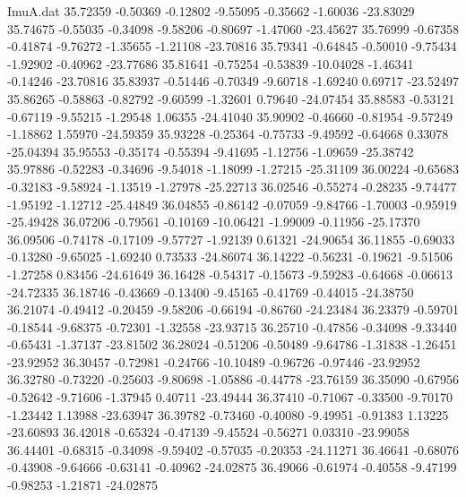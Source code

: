 \begin{filecontents}{ImuA.dat}
  35.72359   -0.50369   -0.12802   -9.55095   -0.35662   -1.60036  -23.83029
  35.74675   -0.55035   -0.34098   -9.58206   -0.80697   -1.47060  -23.45627
  35.76999   -0.67358   -0.41874   -9.76272   -1.35655   -1.21108  -23.70816
  35.79341   -0.64845   -0.50010   -9.75434   -1.92902   -0.40962  -23.77686
  35.81641   -0.75254   -0.53839  -10.04028   -1.46341   -0.14246  -23.70816
  35.83937   -0.51446   -0.70349   -9.60718   -1.69240    0.69717  -23.52497
  35.86265   -0.58863   -0.82792   -9.60599   -1.32601    0.79640  -24.07454
  35.88583   -0.53121   -0.67119   -9.55215   -1.29548    1.06355  -24.41040
  35.90902   -0.46660   -0.81954   -9.57249   -1.18862    1.55970  -24.59359
  35.93228   -0.25364   -0.75733   -9.49592   -0.64668    0.33078  -25.04394
  35.95553   -0.35174   -0.55394   -9.41695   -1.12756   -1.09659  -25.38742
  35.97886   -0.52283   -0.34696   -9.54018   -1.18099   -1.27215  -25.31109
  36.00224   -0.65683   -0.32183   -9.58924   -1.13519   -1.27978  -25.22713
  36.02546   -0.55274   -0.28235   -9.74477   -1.95192   -1.12712  -25.44849
  36.04855   -0.86142   -0.07059   -9.84766   -1.70003   -0.95919  -25.49428
  36.07206   -0.79561   -0.10169  -10.06421   -1.99009   -0.11956  -25.17370
  36.09506   -0.74178   -0.17109   -9.57727   -1.92139    0.61321  -24.90654
  36.11855   -0.69033   -0.13280   -9.65025   -1.69240    0.73533  -24.86074
  36.14222   -0.56231   -0.19621   -9.51506   -1.27258    0.83456  -24.61649
  36.16428   -0.54317   -0.15673   -9.59283   -0.64668   -0.06613  -24.72335
  36.18746   -0.43669   -0.13400   -9.45165   -0.41769   -0.44015  -24.38750
  36.21074   -0.49412   -0.20459   -9.58206   -0.66194   -0.86760  -24.23484
  36.23379   -0.59701   -0.18544   -9.68375   -0.72301   -1.32558  -23.93715
  36.25710   -0.47856   -0.34098   -9.33440   -0.65431   -1.37137  -23.81502
  36.28024   -0.51206   -0.50489   -9.64786   -1.31838   -1.26451  -23.92952
  36.30457   -0.72981   -0.24766  -10.10489   -0.96726   -0.97446  -23.92952
  36.32780   -0.73220   -0.25603   -9.80698   -1.05886   -0.44778  -23.76159
  36.35090   -0.67956   -0.52642   -9.71606   -1.37945    0.40711  -23.49444
  36.37410   -0.71067   -0.33500   -9.70170   -1.23442    1.13988  -23.63947
  36.39782   -0.73460   -0.40080   -9.49951   -0.91383    1.13225  -23.60893
  36.42018   -0.65324   -0.47139   -9.45524   -0.56271    0.03310  -23.99058
  36.44401   -0.68315   -0.34098   -9.59402   -0.57035   -0.20353  -24.11271
  36.46641   -0.68076   -0.43908   -9.64666   -0.63141   -0.40962  -24.02875
  36.49066   -0.61974   -0.40558   -9.47199   -0.98253   -1.21871  -24.02875

\end{filecontents}
